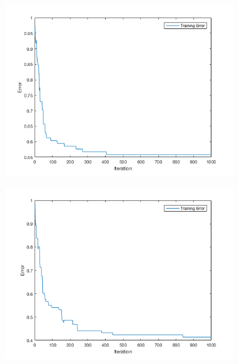 \documentclass[12pt]{article}
\begin{document}
\begin{center}
  \begin{table}[H]
    \begin{varwidth}[b]{0.4\linewidth}
      \centering
      \label{table:NNNYN}
    \end{varwidth}%
    \hfill
    \begin{minipage}[b]{0.6\linewidth}
      \centering
      \includegraphics[width=100mm]{NNNYN_training_error.png}
      \label{fig:NNNYN}
    \end{minipage}
  \end{table}
\end{center}






\begin{center}
  \begin{table}[H]
    \begin{varwidth}[b]{0.4\linewidth}
      \centering
      \label{table:YYNNN}
    \end{varwidth}%
    \hfill
    \begin{minipage}[b]{0.6\linewidth}
      \centering
      \includegraphics[width=100mm]{YYNNN_training_error.png}
      \label{fig:YYNNN}
    \end{minipage}
  \end{table}
\end{center}
\end{document}
